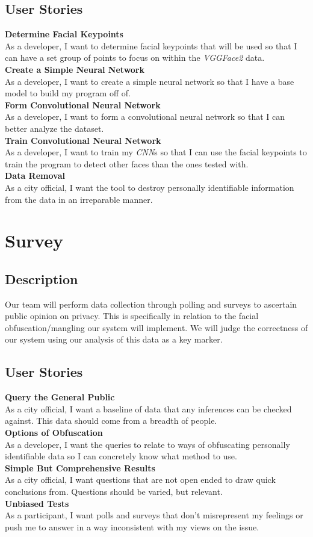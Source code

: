 \documentclass[onecolumn, draftclsnofoot,10pt, compsoc]{IEEEtran}
\begin{document}
\subsection{User Stories}
\textbf{Determine Facial Keypoints} \\
As a developer, I want to determine facial keypoints that will be used so that I can have a set group of points to focus on within the \textit{VGGFace2} data.
\\
\textbf{Create a Simple Neural Network} 
\\
As a developer, I want to create a simple neural network so that I have a base model to build my program off of.
\\
\textbf{Form Convolutional Neural Network}
\\
As a developer, I want to form a convolutional neural network so that I can better analyze the dataset.
\\
\textbf{Train Convolutional Neural Network}
\\
As a developer, I want to train my \textit{CNN}s so that I can use the facial keypoints to train the program to detect other faces than the ones tested with.
\\
\textbf{Data Removal}
\\
As a city official, I want the tool to destroy personally identifiable information from the data in an irreparable manner. 

\section{Survey}
\subsection{Description}
Our team will perform data collection through polling and surveys to ascertain public opinion on privacy. This is specifically in relation to the facial obfuscation/mangling our system will implement. We will judge the correctness of our system using our analysis of this data as a key marker.  
\subsection{User Stories}
\textbf{Query the General Public} 
\\
As a city official, I want a baseline of data that any inferences can be checked against. This data should come from a breadth of people.
\\
\textbf{Options of Obfuscation} 
\\
As a developer, I want the queries to relate to ways of obfuscating personally identifiable data so I can concretely know what method to use. 
\\
\textbf{Simple But Comprehensive Results} 
\\
As a city official, I want questions that are not open ended to draw quick conclusions from. Questions should be varied, but relevant. 
\\
\textbf{Unbiased Tests} 
\\
As a participant, I want polls and surveys that don't misrepresent my feelings or push me to answer in a way inconsistent with my views on the issue.
\end{document}
